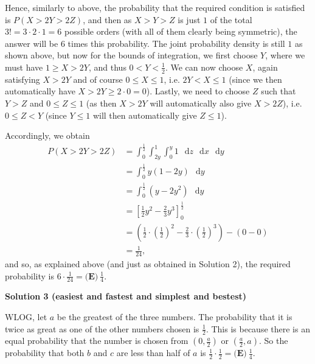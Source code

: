 \begin{enumerate}
 Hence, similarly to above, the probability that the required condition is satisfied is $P(X > 2Y > 2Z)$, and then as $X > Y > Z$ is just $1$ of the total $3! = 3 \cdot 2 \cdot 1 = 6$ possible orders (with all of them clearly being symmetric), the answer will be $6$ times this probability. The joint probability density is still $1$ as shown above, but now for the bounds of integration, we first choose $Y$, where we must have $1 \geq X > 2Y$, and thus $0 < Y < \frac{1}{2}$. We can now choose $X$, again satisfying $X > 2Y$ and of course $0 \leq X \leq 1$, i.e. $2Y < X \leq 1$ (since we then automatically have $X > 2Y \geq 2 \cdot 0 = 0$). Lastly, we need to choose $Z$ such that $Y > Z$ and $0 \leq Z \leq 1$ (as then $X > 2Y$ will automatically also give $X > 2Z$), i.e. $0 \leq Z < Y$ (since $Y \leq 1$ will then automatically give $Z \leq 1$).

 Accordingly, we obtain
 \begin{align*} P(X > 2Y > 2Z) &= \int_{0}^{\frac{1}{2}} \int_{2y}^{1} \int_{0}^{y} 1 \, \mathop{}\!\mathrm{d}z \, \mathop{}\!\mathrm{d}x \, \mathop{}\!\mathrm{d}y \\ &= \int_{0}^{\frac{1}{2}}y(1-2y) \, \mathop{}\!\mathrm{d}y \\ &= \int_{0}^{\frac{1}{2}}\left(y-2y^2\right) \, \mathop{}\!\mathrm{d}y \\ &= \left[\frac{1}{2}y^2-\frac{2}{3}y^3\right]_{0}^{\frac{1}{2}} \\ &= \left(\frac{1}{2} \cdot \left(\frac{1}{2}\right)^2 - \frac{2}{3} \cdot \left(\frac{1}{2}\right)^3\right) - (0-0) \\ &= \frac{1}{24}, \end{align*}
and so, as explained above (and just as obtained in Solution 2), the required probability is $6 \cdot \frac{1}{24} = \boxed{\textbf{(E)}~\frac{1}{4}}$.

 



\textbf{Solution 3 (easiest and fastest and simplest and bestest)}

WLOG, let $a$ be the greatest of the three numbers. The probability that it is twice as great as one of the other numbers chosen is $\frac{1}{2}$. This is because there is an equal probability that the number is chosen from $(0,\frac{a}{2})$ or $(\frac{a}{2},a)$. So the probability that both $b$ and $c$ are less than half of $a$ is $\frac{1}{2} \cdot \frac{1}{2} = \boxed{\textbf{(E)}~\frac{1}{4}}$.

 




\end{enumerate}

